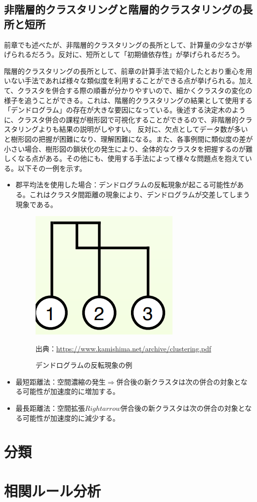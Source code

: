 \documentclass[dvipdfmx]{jsarticle}
\begin{document}
\subsection{非階層的クラスタリングと階層的クラスタリングの長所と短所}
前章でも述べたが、非階層的クラスタリングの長所として、計算量の少なさが挙げられるだろう。反対に、短所として「初期値依存性」が挙げられるだろう。\par
階層的クラスタリングの長所として、前章の計算手法で紹介したとおり重心を用いない手法であれば様々な類似度を利用することができる点が挙げられる。加えて、クラスタを併合する際の順番が分かりやすいので、細かくクラスタの変化の様子を追うことができる。これは、階層的クラスタリングの結果として使用する「デンドログラム」の存在が大きな要因になっている。後述する決定木のように、クラスタ併合の課程が樹形図で可視化することができるので、非階層的クラスタリングよりも結果の説明がしやすい。
反対に、欠点としてデータ数が多いと樹形図の把握が困難になり、理解困難になる。また、各事例間に類似度の差が小さい場合、樹形図の鎖状化の発生により、全体的なクラスタを把握するのが難しくなる点がある。その他にも、使用する手法によって様々な問題点を抱えている。以下その一例を示す。
\begin{itemize}
  \item 郡平均法を使用した場合：デンドログラムの反転現象が起こる可能性がある。これはクラスタ間距離の現象により、デンドログラムが交差してしまう現象である。
  \begin{figure}[H]
    \centering
    \includegraphics[scale=0.4]{images/dendoroHanten.png}
    \caption{デンドログラムの反転現象の例}
    出典：\url{https://www.kamishima.net/archive/clustering.pdf}
  \end{figure}
  \item 最短距離法：空間濃縮の発生$\Rightarrow$併合後の新クラスタは次の併合の対象となる可能性が加速度的に増加する。
  \item 最長距離法：空間拡張$Rightarrow$併合後の新クラスタは次の併合の対象となる可能性が加速度的に減少する。
\end{itemize}




\section{分類}
\section{相関ルール分析}
\end{document}
